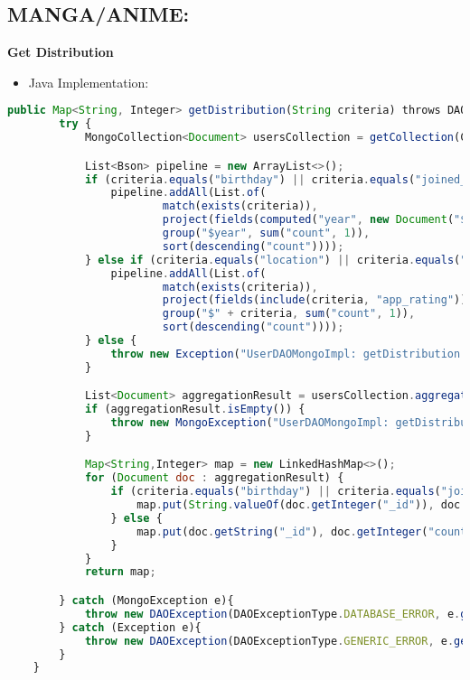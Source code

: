 \subsection*{MANGA/ANIME:}
\textbf{Get Distribution}
\begin{itemize}
    \item Java Implementation:
\end{itemize}
\begin{lstlisting}[language=JavaScript]
    public Map<String, Integer> getDistribution(String criteria) throws DAOException {
        try {
            MongoCollection<Document> usersCollection = getCollection(COLLECTION_NAME);

            List<Bson> pipeline = new ArrayList<>();
            if (criteria.equals("birthday") || criteria.equals("joined_on")) {
                pipeline.addAll(List.of(
                        match(exists(criteria)),
                        project(fields(computed("year", new Document("$year", "$" + criteria)), include("app_rating" ))),
                        group("$year", sum("count", 1)),
                        sort(descending("count"))));
            } else if (criteria.equals("location") || criteria.equals("gender")) {
                pipeline.addAll(List.of(
                        match(exists(criteria)),
                        project(fields(include(criteria, "app_rating"))),
                        group("$" + criteria, sum("count", 1)),
                        sort(descending("count"))));
            } else {
                throw new Exception("UserDAOMongoImpl: getDistribution: Invalid criteria");
            }

            List<Document> aggregationResult = usersCollection.aggregate(pipeline).into(new ArrayList<>());
            if (aggregationResult.isEmpty()) {
                throw new MongoException("UserDAOMongoImpl: getDistribution: No data found");
            }

            Map<String,Integer> map = new LinkedHashMap<>();
            for (Document doc : aggregationResult) {
                if (criteria.equals("birthday") || criteria.equals("joined_on")) {
                    map.put(String.valueOf(doc.getInteger("_id")), doc.getInteger("count"));
                } else {
                    map.put(doc.getString("_id"), doc.getInteger("count"));
                }
            }
            return map;

        } catch (MongoException e){
            throw new DAOException(DAOExceptionType.DATABASE_ERROR, e.getMessage());
        } catch (Exception e){
            throw new DAOException(DAOExceptionType.GENERIC_ERROR, e.getMessage());
        }
    }
    \end{lstlisting}
    
